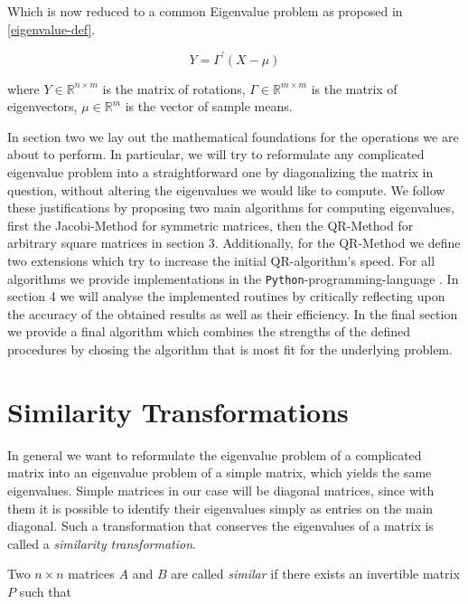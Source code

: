 \documentclass[12pt]{article}
\begin{document}
Which is now reduced to a common Eigenvalue problem as proposed in \ref{eigenvalue-def}.


\begin{equation}
\label{pca_sol}
	Y = \Gamma^{\prime} \left(X - \mu\right)
\end{equation}

where $Y \in \mathbb{R}^{n \times m}$ is the matrix of rotations, 
	  $\Gamma \in \mathbb{R}^{m \times m}$ is the matrix of eigenvectors,
	  $\mu \in \mathbb{R}^m$ is the vector of sample means. \cite{MVA}


In section two we lay out the mathematical foundations for the operations we are about to perform. In particular, we will try to reformulate any complicated eigenvalue problem into a straightforward one by diagonalizing the matrix in question, without altering the eigenvalues we would like to compute. We follow these justifications by proposing two main algorithms for computing eigenvalues, first the Jacobi-Method for symmetric matrices, then the QR-Method for arbitrary square matrices in section 3. Additionally, for the QR-Method we define two extensions which try to increase the initial QR-algorithm's speed.
For all algorithms we provide implementations in the \texttt{Python}-programming-language \cite{python, matplotlib, scipy}. In section 4 we will analyse the implemented routines by critically reflecting upon the accuracy of the obtained results as well as their efficiency. In the final section we provide a final algorithm which combines the strengths of the defined procedures by chosing the algorithm that is most fit for the underlying problem.
\section{Similarity Transformations}

In general we want to reformulate the eigenvalue problem of a complicated matrix into an eigenvalue problem of a simple matrix, which yields the same eigenvalues. Simple matrices in our case will be diagonal matrices, since with them it is possible to identify their eigenvalues simply as entries on the main diagonal. Such a transformation that conserves the eigenvalues of a matrix is called a \textit{similarity transformation}. 

Two $n \times n$ matrices $A$ and $B$ are called \textit{similar} if there exists an invertible matrix $P$ such that
\end{document}
